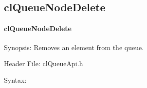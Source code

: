\begin{flushleft}
\subsection{clQueueNodeDelete}
\hypertarget{pageq103}{}\paragraph{cl\-Queue\-Node\-Delete}\label{pageq103}
\begin{Desc}
\item[Synopsis:]Removes an element from the queue.\end{Desc}
\begin{Desc}
\item[Header File:]clQueueApi.h\end{Desc}
\begin{Desc}
\item[Syntax:]


\end{Desc}
\end{flushleft}
